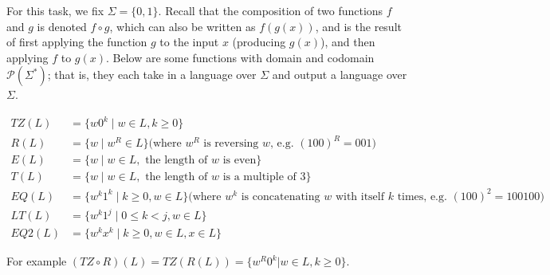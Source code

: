 	For this task, we fix $\Sigma = \{0,1\}$. Recall that the composition of two 
	functions $f$ and $g$ is denoted $f \circ g$, which can also be written as $f(g(x))$, and is the 
	result of first applying the function $g$ to the input $x$ (producing $g(x)$), and then applying $f$ to $g(x)$. 
	Below are some functions with domain and codomain $\mathcal{P}(\Sigma^*)$; that is, they 
	each take in a language over $\Sigma$
	and output a language over $\Sigma$. 
	
	\begin{align*}
		TZ(L) &= \{ w0^k \mid w \in L, k \geq 0 \}\\
		R(L) &= \{ w \mid w^R \in L\} \textrm{(where $w^R$ is reversing $w$, e.g. $(100)^R = 001$)}\\
		E(L) &= \{ w \mid w \in L, \textrm{ the length of $w$ is even} \} \\
		T(L) &= \{ w \mid w \in L, \textrm{ the length of $w$ is a multiple of } 3 \}\\
		EQ(L) &= \{ w^k1^k \mid k \geq 0, w \in L \} \textrm{(where $w^k$ is concatenating $w$ with itself $k$ times, e.g. $(100)^2 = 100100$)}\\
		LT(L) &= \{ w^k1^j \mid 0 \leq k < j , w \in L \}\\
		EQ2(L) &= \{ w^kx^k \mid k \geq 0, w \in L, x \in L \}
	\end{align*}

	For example $(TZ \circ R)(L) = TZ(R(L)) = \{ w^R 0^k | w \in L, k \geq 0\}$.

